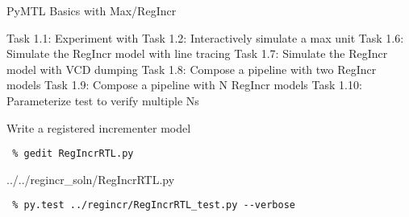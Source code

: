 %
%
%
%
%

\begin{frame}{ PyMTL Basics with Max/RegIncr}
\begin{cbxlist}
  \1 Task 1.1: Experiment with 
  \1 Task 1.2: Interactively simulate a max unit
  \1 
  \1 
  \1 
  \1 Task 1.6: Simulate the RegIncr model with line tracing
  \1 Task 1.7: Simulate the RegIncr model with VCD dumping
  \1 Task 1.8: Compose a pipeline with two RegIncr models
  \1 Task 1.9: Compose a pipeline with N RegIncr models
  \1 Task 1.10: Parameterize test to verify multiple Ns
\end{cbxlist}
\end{frame}

\begin{task}\begin{frame}[fragile]{Write a registered incrementer model}

\vspace{-0.15in}
\begin{Verbatim}[commandchars=\\\{\}]
 % cd    \midtilde/regincr
 % gedit RegIncrRTL.py
\end{Verbatim}
\vspace{-0.17in}

%
{../../regincr_soln/RegIncrRTL.py}

\vspace{-0.2in}
\begin{Verbatim}
 % py.test ../regincr/RegIncrRTL_test.py --verbose
\end{Verbatim}
\end{frame}
\end{task}

